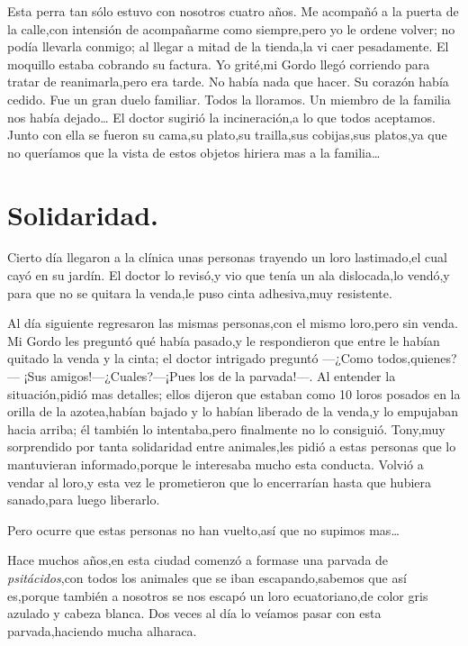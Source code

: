 \documentclass[letterpaper,12pt]{book}
\begin{document}
Esta perra tan sólo estuvo con nosotros cuatro años. Me acompañó a la puerta de la calle,con intensión de acompañarme como siempre,pero yo le ordene volver; no podía llevarla conmigo; al llegar a mitad de la tienda,la vi caer pesadamente. El moquillo estaba cobrando su factura. Yo grité,mi Gordo llegó corriendo para tratar de reanimarla,pero era tarde. No había nada que hacer. Su corazón había cedido. Fue un gran duelo familiar. Todos la lloramos. Un miembro de la familia nos había dejado\ldots
El doctor sugirió la incineración,a lo que todos aceptamos. Junto con ella se fueron su cama,su plato,su trailla,sus cobijas,sus platos,ya que no queríamos que la vista de estos objetos hiriera mas a la familia\ldots


\chapter{Solidaridad.}

Cierto día llegaron a la clínica unas personas trayendo un loro lastimado,el cual cayó en su jardín. El doctor lo revisó,y vio que tenía un ala dislocada,lo vendó,y para que no se quitara la venda,le puso cinta adhesiva,muy resistente. 

Al día siguiente regresaron las mismas personas,con el mismo loro,pero sin venda. Mi Gordo les preguntó qué había pasado,y le respondieron que entre le habían quitado la venda y la cinta; el doctor intrigado preguntó ---¿Como todos,quienes?---
¡Sus amigos!---¿Cuales?---¡Pues los de la parvada!---. Al entender la situación,pidió mas detalles; ellos dijeron que estaban como 10 loros posados en la orilla de la azotea,habían bajado y lo habían liberado de la venda,y lo empujaban hacia arriba; él también lo intentaba,pero finalmente no lo consiguió. Tony,muy sorprendido por tanta solidaridad entre animales,les pidió a estas personas que lo mantuvieran informado,porque le interesaba mucho esta conducta. Volvió a vendar al loro,y esta vez le prometieron que lo encerrarían hasta que hubiera sanado,para luego liberarlo.

Pero ocurre que estas personas no han vuelto,así que no supimos mas\ldots

Hace muchos años,en esta ciudad comenzó a formase una parvada de \textit{psitácidos},con todos los animales que se iban escapando,sabemos que así es,porque también a nosotros se nos escapó un loro ecuatoriano,de color gris azulado y cabeza blanca. Dos veces al día lo veíamos pasar con esta parvada,haciendo mucha alharaca. 
\end{document}
